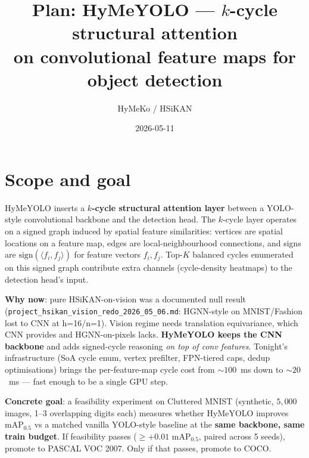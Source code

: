 \documentclass[11pt,a4paper]{article}
\title{Plan: HyMeYOLO --- $k$-cycle structural attention\\
       on convolutional feature maps for object detection}
\author{HyMeKo / HSiKAN}
\date{2026-05-11}
\begin{document}
\maketitle

\section{Scope and goal}
HyMeYOLO inserts a \textbf{$k$-cycle structural attention layer} between
a YOLO-style convolutional backbone and the detection head.  The
$k$-cycle layer operates on a signed graph induced by spatial feature
similarities: vertices are spatial locations on a feature map, edges
are local-neighbourhood connections, and signs are
$\text{sign}(\langle f_i, f_j \rangle)$ for feature vectors $f_i,
f_j$.  Top-$K$ balanced cycles enumerated on this signed graph
contribute extra channels (cycle-density heatmaps) to the detection
head's input.

\textbf{Why now}: pure HSiKAN-on-vision was a documented null result
(\texttt{project\_hsikan\_vision\_redo\_2026\_05\_06.md}: HGNN-style
on MNIST/Fashion lost to CNN at h=16/n=1).  Vision regime needs
translation equivariance, which CNN provides and HGNN-on-pixels lacks.
\textbf{HyMeYOLO keeps the CNN backbone} and adds signed-cycle
reasoning \emph{on top of conv features}.  Tonight's infrastructure
(SoA cycle enum, vertex prefilter, FPN-tiered caps, dedup
optimisations) brings the per-feature-map cycle cost from $\sim 100$~ms
down to $\sim 20$~ms --- fast enough to be a single GPU step.

\textbf{Concrete goal}: a feasibility experiment on Cluttered MNIST
(synthetic, $5{,}000$ images, 1--3 overlapping digits each) measures
whether HyMeYOLO improves mAP$_{0.5}$ vs a matched vanilla
YOLO-style baseline at the \textbf{same backbone, same train budget}.
If feasibility passes ($\geq +0.01$ mAP$_{0.5}$, paired across 5
seeds), promote to PASCAL VOC 2007.  Only if that passes, promote
to COCO.
\end{document}
